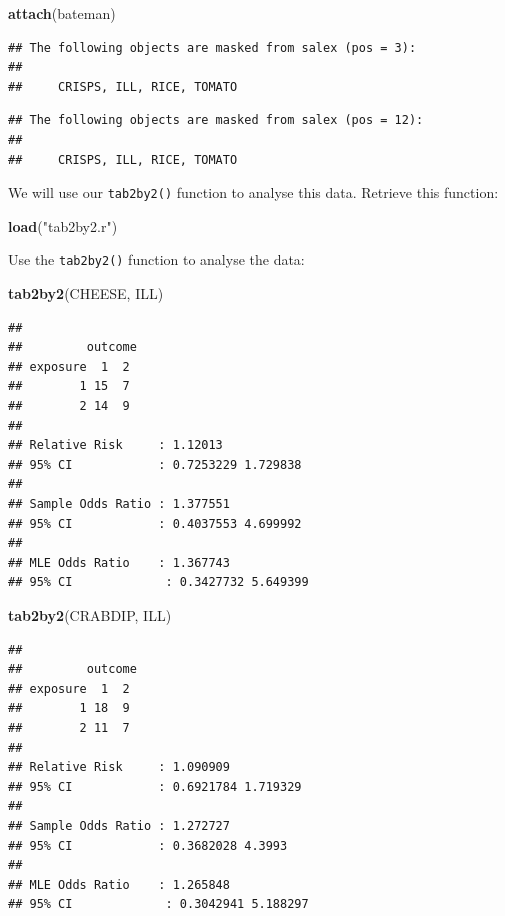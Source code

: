 \documentclass[12pt,]{book}
\newenvironment{Shaded}{\begin{snugshade}}{\end{snugshade}}
\newcommand{\KeywordTok}[1]{\textcolor[rgb]{0.13,0.29,0.53}{\textbf{#1}}}
\newcommand{\StringTok}[1]{\textcolor[rgb]{0.31,0.60,0.02}{#1}}
\newcommand{\NormalTok}[1]{#1}
\theoremstyle{definition}
\theoremstyle{definition}
\theoremstyle{definition}
\theoremstyle{remark}
\begin{document}
\begin{Shaded}
\begin{Highlighting}[]
\KeywordTok{attach}\NormalTok{(bateman)}
\end{Highlighting}
\end{Shaded}

\begin{verbatim}
## The following objects are masked from salex (pos = 3):
## 
##     CRISPS, ILL, RICE, TOMATO
\end{verbatim}

\begin{verbatim}
## The following objects are masked from salex (pos = 12):
## 
##     CRISPS, ILL, RICE, TOMATO
\end{verbatim}

We will use our \texttt{tab2by2()} function to analyse this data.
Retrieve this function:

\begin{Shaded}
\begin{Highlighting}[]
\KeywordTok{load}\NormalTok{(}\StringTok{"tab2by2.r"}\NormalTok{)}
\end{Highlighting}
\end{Shaded}

Use the \texttt{tab2by2()} function to analyse the data:

\begin{Shaded}
\begin{Highlighting}[]
\KeywordTok{tab2by2}\NormalTok{(CHEESE, ILL)}
\end{Highlighting}
\end{Shaded}

\begin{verbatim}
## 
##         outcome
## exposure  1  2
##        1 15  7
##        2 14  9
## 
## Relative Risk     : 1.12013 
## 95% CI            : 0.7253229 1.729838 
## 
## Sample Odds Ratio : 1.377551 
## 95% CI            : 0.4037553 4.699992 
## 
## MLE Odds Ratio    : 1.367743 
## 95% CI             : 0.3427732 5.649399
\end{verbatim}

\begin{Shaded}
\begin{Highlighting}[]
\KeywordTok{tab2by2}\NormalTok{(CRABDIP, ILL)}
\end{Highlighting}
\end{Shaded}

\begin{verbatim}
## 
##         outcome
## exposure  1  2
##        1 18  9
##        2 11  7
## 
## Relative Risk     : 1.090909 
## 95% CI            : 0.6921784 1.719329 
## 
## Sample Odds Ratio : 1.272727 
## 95% CI            : 0.3682028 4.3993 
## 
## MLE Odds Ratio    : 1.265848 
## 95% CI             : 0.3042941 5.188297
\end{verbatim}
\end{document}
